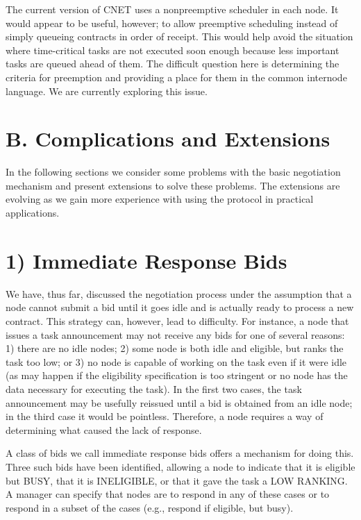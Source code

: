 \documentclass[
]{article}
\begin{document}
The current version of CNET uses a nonpreemptive scheduler in each node.
It would appear to be useful, however; to allow preemptive scheduling
instead of simply queueing contracts in order of receipt. This would
help avoid the situation where time-critical tasks are not executed soon
enough because less important tasks are queued ahead of them. The
difficult question here is determining the criteria for preemption and
providing a place for them in the common internode language. We are
currently exploring this issue.

\section{B. Complications and
Extensions}\label{b.-complications-and-extensions}

In the following sections we consider some problems with the basic
negotiation mechanism and present extensions to solve these problems.
The extensions are evolving as we gain more experience with using the
protocol in practical applications.

\section{1) Immediate Response Bids}\label{immediate-response-bids}

We have, thus far, discussed the negotiation process under the
assumption that a node cannot submit a bid until it goes idle and is
actually ready to process a new contract. This strategy can, however,
lead to difficulty. For instance, a node that issues a task announcement
may not receive any bids for one of several reasons: 1) there are no
idle nodes; 2) some node is both idle and eligible, but ranks the task
too low; or 3) no node is capable of working on the task even if it were
idle (as may happen if the eligibility specification is too stringent or
no node has the data necessary for executing the task). In the first two
cases, the task announcement may be usefully reissued until a bid is
obtained from an idle node; in the third case it would be pointless.
Therefore, a node requires a way of determining what caused the lack of
response.

A class of bids we call immediate response bids offers a mechanism for
doing this. Three such bids have been identified, allowing a node to
indicate that it is eligible but BUSY, that it is INELIGIBLE, or that it
gave the task a LOW RANKING. A manager can specify that nodes are to
respond in any of these cases or to respond in a subset of the cases
(e.g., respond if eligible, but busy).
\end{document}
